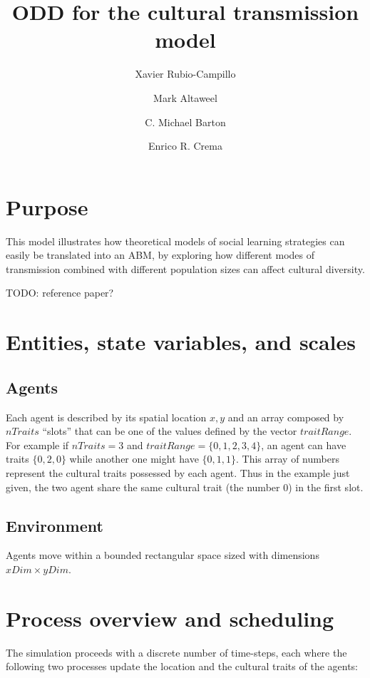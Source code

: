 \documentclass[11pt,a4paper,twocolumn,notitlepage]{article}
\begin{document}
\title{ODD for the cultural transmission model}
\author{Xavier Rubio-Campillo \and Mark Altaweel \and C. Michael Barton \and Enrico R. Crema}
\maketitle

\section{Purpose}

This model illustrates how theoretical models of social learning strategies can easily be translated into an ABM, by exploring how different modes of transmission combined with different population sizes can affect cultural diversity.

TODO: reference paper?

\section{Entities, state variables, and scales}
\subsection{Agents}

Each agent is described by its spatial location $x,y$ and an array composed by $nTraits$ “slots” that can be one of the values defined by the vector $traitRange$. For example if $nTraits=3$ and $traitRange=\{0,1,2,3,4\}$, an agent can have traits $\{0,2,0\}$ while another one might have $\{0,1,1\}$. This array of numbers represent the cultural traits possessed by each agent. Thus in the example just given, the two agent share the same cultural trait (the number $0$) in the first slot.

\subsection{Environment}

Agents move within a bounded rectangular space sized with dimensions $xDim \times yDim$.

\section{Process overview and scheduling}

The simulation proceeds with a discrete number of time-steps, each where the following two processes update the location and the cultural traits of the agents:
\end{document}
